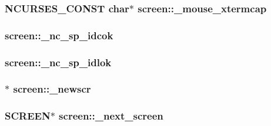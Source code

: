 \hypertarget{structscreen_ade184a9c8426fea2004500d841f3c447}{
\subsubsection[{\-\_\-mouse\-\_\-xtermcap}]{\setlength{\rightskip}{0pt plus 5cm}N\-C\-U\-R\-S\-E\-S\-\_\-\-C\-O\-N\-S\-T char$\ast$ screen\-::\-\_\-mouse\-\_\-xtermcap}}\label{structscreen_ade184a9c8426fea2004500d841f3c447}
\hypertarget{structscreen_a87446f745d08c7c40e3e476848942551}{
\subsubsection[{\-\_\-nc\-\_\-sp\-\_\-idcok}]{ screen\-::\-\_\-nc\-\_\-sp\-\_\-idcok}}\label{structscreen_a87446f745d08c7c40e3e476848942551}
\hypertarget{structscreen_a218ab02fba29e0b5477e5cb12eb9bc42}{
\subsubsection[{\-\_\-nc\-\_\-sp\-\_\-idlok}]{ screen\-::\-\_\-nc\-\_\-sp\-\_\-idlok}}\label{structscreen_a218ab02fba29e0b5477e5cb12eb9bc42}
\hypertarget{structscreen_af1d27499ca7f4b4cec4583db004a8c93}{
\subsubsection[{\-\_\-newscr}]{$\ast$ screen\-::\-\_\-newscr}}\label{structscreen_af1d27499ca7f4b4cec4583db004a8c93}
\hypertarget{structscreen_a423c99588492b6c224e5eedc65d76af0}{
\subsubsection[{\-\_\-next\-\_\-screen}]{\setlength{\rightskip}{0pt plus 5cm}S\-C\-R\-E\-E\-N$\ast$ screen\-::\-\_\-next\-\_\-screen}}\label{structscreen_a423c99588492b6c224e5eedc65d76af0}
